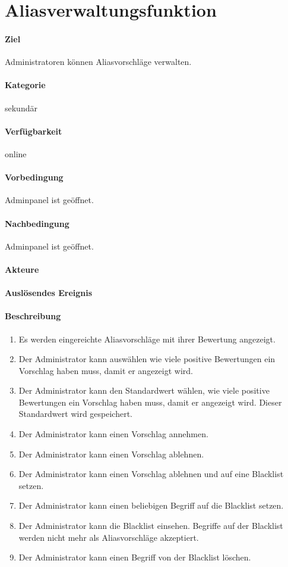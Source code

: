 \section{Aliasverwaltungsfunktion}
\label{Aliasverwaltungsfunktion}
\paragraph{Ziel}
Administratoren können Aliasvorschläge verwalten.
\paragraph{Kategorie}
sekundär
\paragraph{Verfügbarkeit}
online
\paragraph{Vorbedingung}
Adminpanel ist geöffnet.
\paragraph{Nachbedingung}
Adminpanel ist geöffnet.
\paragraph{Akteure}

\paragraph{Auslösendes Ereignis}

\paragraph{Beschreibung}
\begin{enumerate}
    \item Es werden eingereichte Aliasvorschläge mit ihrer Bewertung angezeigt.
    \item Der Administrator kann auswählen wie viele positive Bewertungen ein Vorschlag haben muss, damit er angezeigt wird.
    \item Der Administrator kann den Standardwert wählen, wie viele positive Bewertungen ein Vorschlag haben muss, damit er angezeigt wird. Dieser Standardwert wird gespeichert.
    \item Der Administrator kann einen Vorschlag annehmen.
    \item Der Administrator kann einen Vorschlag ablehnen.
    \item Der Administrator kann einen Vorschlag ablehnen und auf eine Blacklist setzen.
    \item Der Administrator kann einen beliebigen Begriff auf die Blacklist setzen.
    \item Der Administrator kann die Blacklist einsehen. Begriffe auf der Blacklist werden nicht mehr als Aliasvorschläge akzeptiert.
    \item Der Administrator kann einen Begriff von der Blacklist löschen.
\end{enumerate}